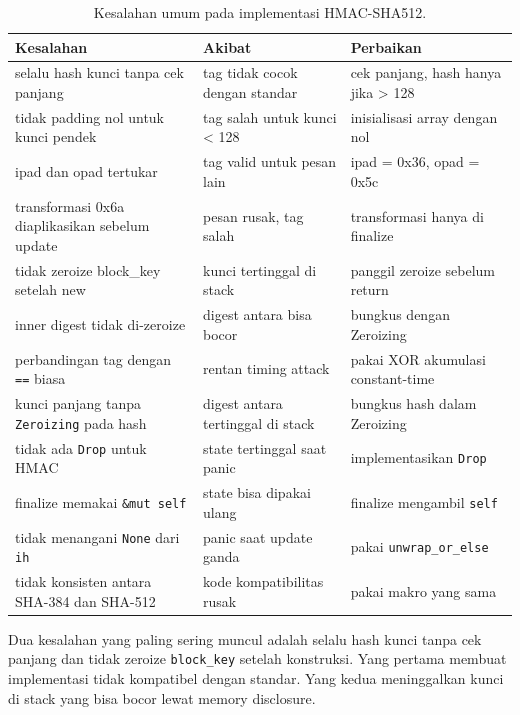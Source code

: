 \documentclass[11pt,a4paper]{article}
\begin{document}
\begin{table}[H]
	\centering
	\caption{Kesalahan umum pada implementasi HMAC-SHA512.}
	\label{tab:mistakes}
	\footnotesize
	\begin{tabularx}{\textwidth}{l X X}
		\toprule
		Kesalahan                                        & Akibat                            & Perbaikan                          \\
		\midrule
		selalu hash kunci tanpa cek panjang              & tag tidak cocok dengan standar    & cek panjang, hash hanya jika > 128 \\
		tidak padding nol untuk kunci pendek             & tag salah untuk kunci < 128       & inisialisasi array dengan nol      \\
		ipad dan opad tertukar                           & tag valid untuk pesan lain        & ipad = 0x36, opad = 0x5c           \\
		transformasi 0x6a diaplikasikan sebelum update   & pesan rusak, tag salah            & transformasi hanya di finalize     \\
		tidak zeroize block\_key setelah new             & kunci tertinggal di stack         & panggil zeroize sebelum return     \\
		inner digest tidak di-zeroize                    & digest antara bisa bocor          & bungkus dengan Zeroizing           \\
		perbandingan tag dengan \texttt{==} biasa        & rentan timing attack              & pakai XOR akumulasi constant-time  \\
		kunci panjang tanpa \texttt{Zeroizing} pada hash & digest antara tertinggal di stack & bungkus hash dalam Zeroizing       \\
		tidak ada \texttt{Drop} untuk HMAC               & state tertinggal saat panic       & implementasikan \texttt{Drop}      \\
		finalize memakai \texttt{\&mut self}             & state bisa dipakai ulang          & finalize mengambil \texttt{self}   \\
		tidak menangani \texttt{None} dari \texttt{ih}   & panic saat update ganda           & pakai \texttt{unwrap\_or\_else}    \\
		tidak konsisten antara SHA-384 dan SHA-512       & kode kompatibilitas rusak         & pakai makro yang sama              \\
		\bottomrule
	\end{tabularx}
\end{table}

Dua kesalahan yang paling sering muncul adalah selalu hash kunci tanpa cek panjang dan tidak zeroize \texttt{block\_key} setelah konstruksi. Yang pertama membuat implementasi tidak kompatibel dengan standar. Yang kedua meninggalkan kunci di stack yang bisa bocor lewat memory disclosure.
\end{document}
